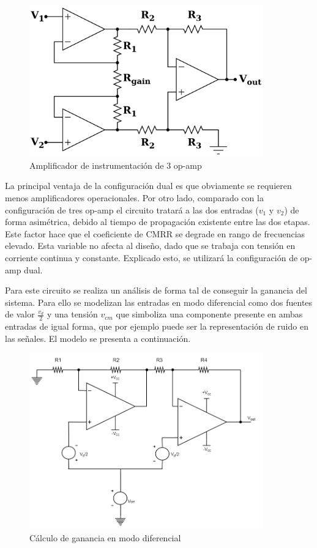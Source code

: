 \begin{figure}[H]
    \centering
    \includegraphics[width=0.9\textwidth]{../EJ4/resources/instrumental_3opamp.png}
    \caption{Amplificador de instrumentaci\'on de 3 op-amp}
    \label{fig:EJ4_instrumental_3opamp}
\end{figure}
 
 La principal ventaja de la configuraci\'on dual es que obviamente se requieren menos amplificadores operacionales. Por otro lado, comparado con la configuraci\'on de tres op-amp el circuito tratar\'a a las dos entradas ($v_1$ y $v_2$) de forma asim\'etrica, debido al tiempo de propagaci\'on existente entre las dos etapas. Este factor hace que el coeficiente de CMRR se degrade en rango de frecuencias elevado. Esta variable no afecta al diseño, dado que se trabaja con tensi\'on en corriente continua y constante. Explicado esto, se utilizar\'a la configuraci\'on de op-amp dual.
 
 
Para este circuito se realiza un an\'alisis de forma tal de conseguir la ganancia del sistema. Para ello se modelizan las entradas en modo diferencial como dos fuentes de valor $\frac{v_d}{2}$ y una tensi\'on $v_{cm}$ que simboliza una componente presente en ambas entradas de igual forma, que por ejemplo puede ser la representaci\'on de ruido en las se\~nales. El modelo se presenta a continuaci\'on.

\begin{figure}[H]
    \centering
    \includegraphics[width=0.9\textwidth]{../EJ4/resources/2opamp_difmode_gain.png}
    \caption{C\'alculo de ganancia en modo diferencial}
    \label{fig:EJ4_2opamp_difmode_gain}
\end{figure}

